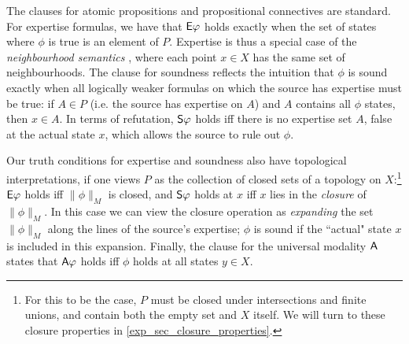 The clauses for atomic propositions and propositional
connectives are standard. For expertise formulas, we have that $\E\phi$
holds exactly when the set of states where $\phi$ is true is an element
of $P$. Expertise is thus a special case of the \emph{neighbourhood semantics}
\cite{pacuit2017neighborhood}, where each point $x \in X$ has the same
set of neighbourhoods. The clause for soundness reflects the intuition that
$\phi$ is sound exactly when all logically weaker formulas on which the
source has expertise must be true: if $A \in P$ (i.e. the source has
expertise on $A$) and $A$ contains all $\phi$ states, then
$x \in A$. In terms of refutation, $\S\phi$ holds iff there is no
expertise set $A$, false at the actual state $x$, which allows the
source to rule out $\phi$.

Our truth conditions for expertise and soundness also have topological
interpretations, if one views $P$ as the collection of closed sets of a
topology on $X$:\footnote{For this to be the case, $P$ must be closed under
intersections and finite unions, and contain both the empty set and $X$ itself.
We will turn to these closure properties in \cref{exp_sec_closure_properties}.} $\E\phi$ holds
iff $\|\phi\|_M$ is closed, and $\S\phi$ holds at $x$ iff $x$ lies in the
\emph{closure} of $\|\phi\|_M$.\footnotemark{} In this case we can view the
closure operation as \emph{expanding} the set $\|\phi\|_M$ along the lines of
the source's expertise; $\phi$ is sound if the ``actual" state $x$ is included
in this expansion.
%
Finally, the clause for the universal modality $\A$ states that $\A\phi$ holds
iff $\phi$ holds at all states $y \in X$.


\def\w{1}
\def\h{0.4}
\newcommand{\examplemodel}{
    \tikzset{mynode/.style={color=black}}
    \node[mynode] (a) at (0, 0) {$ipd$};
    \node[mynode] (b) at (\w, 0) {$pd$};
    \node[mynode] (c) at (0, \h) {$ip$};
    \node[mynode] (d) at (\w, \h) {$p$};
    \node[mynode] (e) at (0, 2*\h) {$id$};
    \node[mynode] (f) at (\w, 2*\h) {$d$};
    \node[mynode] (g) at (0, 3*\h) {$i$};
    \node[mynode] (h) at (\w, 3*\h) {$\emptyset$};
}

